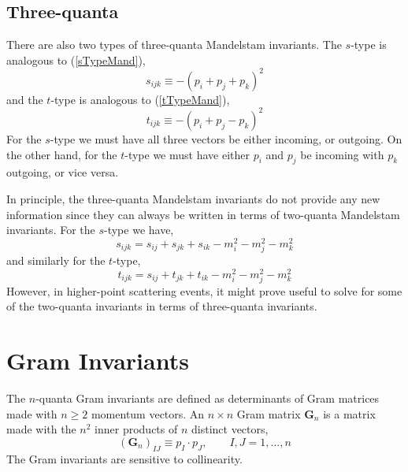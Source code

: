 \subsection{Three-quanta}
There are also two types of three-quanta Mandelstam invariants. The $s$-type is analogous to (\ref{sTypeMand}),
\begin{equation}
	s_{ijk} \equiv -(p_{i} + p_{j} + p_{k})^{2}
\end{equation}
and the $t$-type is analogous to (\ref{tTypeMand}),
\begin{equation}
	t_{ijk} \equiv -(p_{i} + p_{j} - p_{k})^{2}
\end{equation}
For the $s$-type we must have all three vectors be either incoming, or outgoing. On the other hand, for the $t$-type we must have either $p_{i}$ and $p_{j}$ be incoming with $p_{k}$ outgoing, or vice versa.

In principle, the three-quanta Mandelstam invariants do not provide any new information since they can always be written in terms of two-quanta Mandelstam invariants. For the $s$-type we have,
\begin{equation}
	s_{ijk} = s_{ij} + s_{jk} + s_{ik} - m_{i}^{2} - m_{j}^{2} - m_{k}^{2}
\end{equation}
and similarly for the $t$-type,
\begin{equation}
	t_{ijk} = s_{ij} + t_{jk} + t_{ik} - m_{i}^{2} - m_{j}^{2} - m_{k}^{2}
\end{equation}
However, in higher-point scattering events, it might prove useful to solve for some of the two-quanta invariants in terms of three-quanta invariants.
\section{Gram Invariants}
The $n$-quanta Gram invariants are defined as determinants of Gram matrices made with $n \geq 2$ momentum vectors. An $n \times n$ Gram matrix $\mathbf{G}_{n}$ is a matrix made with the $n^{2}$ inner products of $n$ distinct vectors,
\begin{equation}
	(\mathbf{G}_{n})_{IJ} \equiv p_{I} \cdot p_{J}, \qquad I, J = 1, \ldots, n
\end{equation}
The Gram invariants are sensitive to collinearity.
